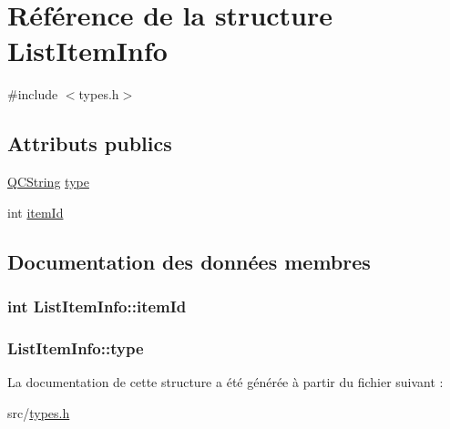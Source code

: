 \hypertarget{struct_list_item_info}{}\section{Référence de la structure List\+Item\+Info}
\label{struct_list_item_info}


{\ttfamily \#include $<$types.\+h$>$}

\subsection*{Attributs publics}
\begin{DoxyCompactItemize}
\item 
\hyperlink{class_q_c_string}{Q\+C\+String} \hyperlink{struct_list_item_info_a06163c0e861ec13f8b8d24823d04b1f9}{type}
\item 
int \hyperlink{struct_list_item_info_a98dbe1449912070056112940c1ff0208}{item\+Id}
\end{DoxyCompactItemize}


\subsection{Documentation des données membres}
\hypertarget{struct_list_item_info_a98dbe1449912070056112940c1ff0208}{}
\subsubsection[{item\+Id}]{\setlength{\rightskip}{0pt plus 5cm}int List\+Item\+Info\+::item\+Id}\label{struct_list_item_info_a98dbe1449912070056112940c1ff0208}
\hypertarget{struct_list_item_info_a06163c0e861ec13f8b8d24823d04b1f9}{}
\subsubsection[{type}]{ List\+Item\+Info\+::type}\label{struct_list_item_info_a06163c0e861ec13f8b8d24823d04b1f9}


La documentation de cette structure a été générée à partir du fichier suivant \+:\begin{DoxyCompactItemize}
\item 
src/\hyperlink{types_8h}{types.\+h}\end{DoxyCompactItemize}
